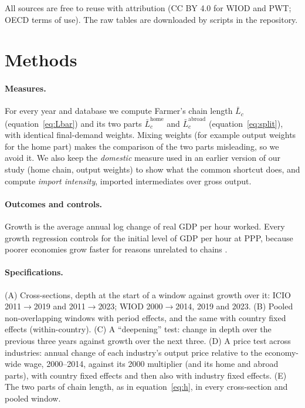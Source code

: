 \documentclass[11pt,a4paper]{article}
\newcommand{\Lbar}{\bar L}
\newcommand{\Lhome}{\bar L^{\text{home}}}
\newcommand{\Labroad}{\bar L^{\text{abroad}}}
\begin{document}
All sources are free to reuse with attribution (CC BY 4.0 for WIOD and PWT; OECD
terms of use). The raw tables are downloaded by scripts in the repository.

\section{Methods}\label{sec:methods}

\paragraph{Measures.} For every year and database we compute Farmer's chain length
$\Lbar_c$ (equation~\ref{eq:Lbar}) and its two parts $\Lhome_c$ and $\Labroad_c$
(equation~\ref{eq:split}), with identical final-demand weights. Mixing weights
(for example output weights for the home part) makes the comparison of the two
parts misleading, so we avoid it. We also keep the \emph{domestic} measure used in
an earlier version of our study (home chain, output weights) to show what the
common shortcut does, and compute \emph{import intensity}, imported intermediates
over gross output.

\paragraph{Outcomes and controls.} Growth is the average annual log change of
real GDP per hour worked. Every growth regression controls for the initial
level of GDP per hour at PPP, because poorer economies grow faster for reasons
unrelated to chains \citep{barro1991}.

\paragraph{Specifications.} (A) Cross-sections, depth at the start of a window
against growth over it: ICIO 2011$\to$2019 and 2011$\to$2023; WIOD
2000$\to$2014, 2019 and 2023. (B) Pooled non-overlapping windows with period
effects, and the same with country fixed effects (within-country). (C) A
``deepening'' test: change in depth over the previous three years against growth
over the next three. (D) A price test across \PriceN{} industries: annual change
of each industry's output price relative to the economy-wide wage, 2000--2014,
against its 2000 multiplier (and its home and abroad parts), with country fixed
effects and then also with industry fixed effects. (E) The two parts of chain
length, as in equation~\eqref{eq:h}, in every cross-section and pooled window.
\end{document}
